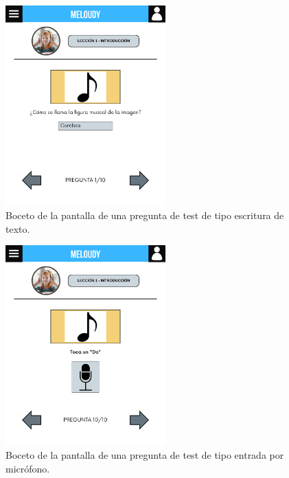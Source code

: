 \begin{figure}[H]
    \centering
    \centerline{\includegraphics[width=0.55\textwidth, frame]{imagenes/c6/7.png}}
    \caption{Boceto de la pantalla de una pregunta de test de tipo escritura de texto.}
    \label{fig:escrituratexto}
\end{figure}

\begin{figure}[H]
    \centering
    \centerline{\includegraphics[width=0.55\textwidth, frame]{imagenes/c6/8.png}}
    \caption{Boceto de la pantalla de una pregunta de test de tipo entrada por micrófono.}
    \label{fig:microfono}
\end{figure}

